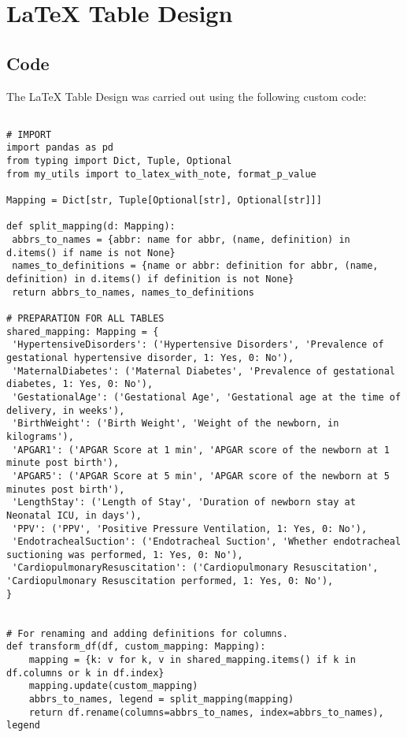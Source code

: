 \documentclass[11pt]{article}
\begin{document}
\section{LaTeX Table Design} \subsection{Code}The LaTeX Table Design was carried out using the following custom code:

\begin{verbatim}

# IMPORT
import pandas as pd
from typing import Dict, Tuple, Optional
from my_utils import to_latex_with_note, format_p_value

Mapping = Dict[str, Tuple[Optional[str], Optional[str]]]

def split_mapping(d: Mapping):
 abbrs_to_names = {abbr: name for abbr, (name, definition) in d.items() if name is not None}
 names_to_definitions = {name or abbr: definition for abbr, (name, definition) in d.items() if definition is not None}
 return abbrs_to_names, names_to_definitions

# PREPARATION FOR ALL TABLES
shared_mapping: Mapping = {
 'HypertensiveDisorders': ('Hypertensive Disorders', 'Prevalence of gestational hypertensive disorder, 1: Yes, 0: No'),
 'MaternalDiabetes': ('Maternal Diabetes', 'Prevalence of gestational diabetes, 1: Yes, 0: No'),
 'GestationalAge': ('Gestational Age', 'Gestational age at the time of delivery, in weeks'),
 'BirthWeight': ('Birth Weight', 'Weight of the newborn, in kilograms'),
 'APGAR1': ('APGAR Score at 1 min', 'APGAR score of the newborn at 1 minute post birth'),
 'APGAR5': ('APGAR Score at 5 min', 'APGAR score of the newborn at 5 minutes post birth'),
 'LengthStay': ('Length of Stay', 'Duration of newborn stay at Neonatal ICU, in days'),
 'PPV': ('PPV', 'Positive Pressure Ventilation, 1: Yes, 0: No'),
 'EndotrachealSuction': ('Endotracheal Suction', 'Whether endotracheal suctioning was performed, 1: Yes, 0: No'),
 'CardiopulmonaryResuscitation': ('Cardiopulmonary Resuscitation', 'Cardiopulmonary Resuscitation performed, 1: Yes, 0: No'),
}


# For renaming and adding definitions for columns.
def transform_df(df, custom_mapping: Mapping):
    mapping = {k: v for k, v in shared_mapping.items() if k in df.columns or k in df.index}
    mapping.update(custom_mapping)
    abbrs_to_names, legend = split_mapping(mapping)
    return df.rename(columns=abbrs_to_names, index=abbrs_to_names), legend


\end{verbatim}
\end{document}
